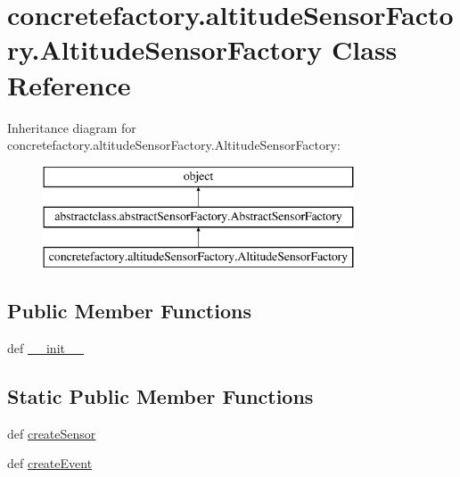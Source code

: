 \hypertarget{classconcretefactory_1_1altitudeSensorFactory_1_1AltitudeSensorFactory}{}\section{concretefactory.\+altitude\+Sensor\+Factory.\+Altitude\+Sensor\+Factory Class Reference}
\label{classconcretefactory_1_1altitudeSensorFactory_1_1AltitudeSensorFactory}
Inheritance diagram for concretefactory.\+altitude\+Sensor\+Factory.\+Altitude\+Sensor\+Factory\+:\begin{figure}[H]
\begin{center}
\leavevmode
\includegraphics[height=3.000000cm]{classconcretefactory_1_1altitudeSensorFactory_1_1AltitudeSensorFactory}
\end{center}
\end{figure}
\subsection*{Public Member Functions}
\begin{DoxyCompactItemize}
\item 
def \hyperlink{classconcretefactory_1_1altitudeSensorFactory_1_1AltitudeSensorFactory_a489fac203ad5c6ecf0eade88c94eca6a}{\+\_\+\+\_\+init\+\_\+\+\_\+}
\end{DoxyCompactItemize}
\subsection*{Static Public Member Functions}
\begin{DoxyCompactItemize}
\item 
def \hyperlink{classconcretefactory_1_1altitudeSensorFactory_1_1AltitudeSensorFactory_a9c77491290cc1495655080099863c61b}{create\+Sensor}
\item 
def \hyperlink{classconcretefactory_1_1altitudeSensorFactory_1_1AltitudeSensorFactory_ab17da82a4c3f02f4eaaa14d0b9edfc23}{create\+Event}
\end{DoxyCompactItemize}


